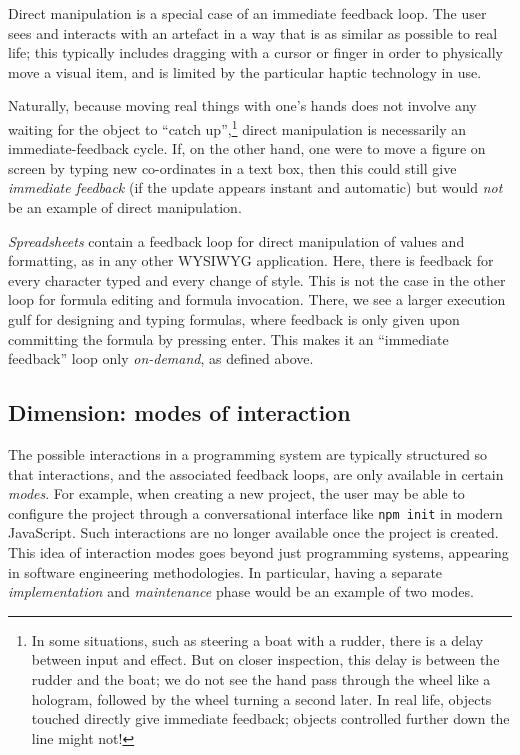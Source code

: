 \documentclass[ twoside,openright,titlepage,numbers=noenddot,headinclude,footinclude,cleardoublepage=empty,abstract=on,
                BCOR=5mm,paper=a4,fontsize=11pt
                ]{scrreprt}
\theoremstyle{definition}
\begin{document}
Direct manipulation \parencite{DirectManip} is a special case of an
immediate feedback loop. The user sees and interacts with an artefact in
a way that is as similar as possible to real life; this typically
includes dragging with a cursor or finger in order to physically move a
visual item, and is limited by the particular haptic technology in use.

Naturally, because moving real things with one's hands does not involve
any waiting for the object to ``catch up'',\footnote{In some situations,
  such as steering a boat with a rudder, there is a delay between input
  and effect. But on closer inspection, this delay is between the rudder
  and the boat; we do not see the hand pass through the wheel like a
  hologram, followed by the wheel turning a second later. In real life,
  objects touched directly give immediate feedback; objects controlled
  further down the line might not!} direct manipulation is necessarily
an immediate-feedback cycle. If, on the other hand, one were to move a
figure on screen by typing new co-ordinates in a text box, then this
could still give \emph{immediate feedback} (if the update appears
instant and automatic) but would \emph{not} be an example of direct
manipulation.

\emph{Spreadsheets} contain a feedback loop for direct manipulation of
values and formatting, as in any other WYSIWYG application. Here, there
is feedback for every character typed and every change of style. This is
not the case in the other loop for formula editing and formula
invocation. There, we see a larger execution gulf for designing and
typing formulas, where feedback is only given upon committing the
formula by pressing enter. This makes it an ``immediate feedback'' loop
only \emph{on-demand}, as defined above.

\hypertarget{dimension-modes-of-interaction}{\subsection{Dimension: modes of
interaction}\label{dimension-modes-of-interaction}}

The possible interactions in a programming system are typically
structured so that interactions, and the associated feedback loops, are
only available in certain \emph{modes}. For example, when creating a new
project, the user may be able to configure the project through a
conversational interface like \texttt{npm\ init} in modern JavaScript.
Such interactions are no longer available once the project is created.
This idea of interaction modes goes beyond just programming systems,
appearing in software engineering methodologies. In particular, having a
separate \emph{implementation} and \emph{maintenance} phase would be an
example of two modes.
\end{document}
